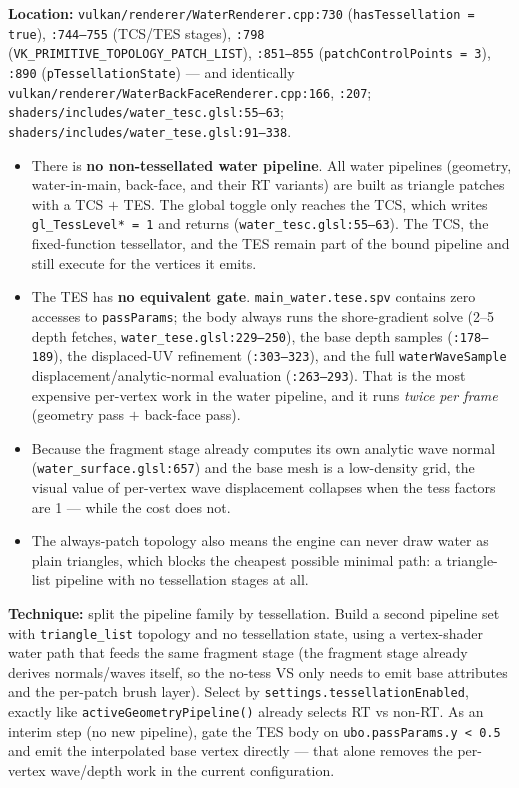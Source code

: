 \documentclass[11pt,a4paper]{article}
\begin{document}
\textbf{Location:} \texttt{vulkan/renderer/WaterRenderer.cpp:730} (\texttt{hasTessellation = true}), \texttt{:744--755} (TCS/TES stages), \texttt{:798}
(\texttt{VK\_PRIMITIVE\_TOPOLOGY\_PATCH\_LIST}), \texttt{:851--855} (\texttt{patchControlPoints = 3}), \texttt{:890} (\texttt{pTessellationState}) --- and identically
\texttt{vulkan/renderer/WaterBackFaceRenderer.cpp:166}, \texttt{:207}; \texttt{shaders/includes/water\_tesc.glsl:55--63}; \texttt{shaders/includes/water\_tese.glsl:91--338}.

\begin{itemize}
    \item There is \textbf{no non-tessellated water pipeline}. All water pipelines (geometry, water-in-main, back-face, and their RT variants) are built as triangle patches with a
    TCS $+$ TES. The global toggle only reaches the TCS, which writes \texttt{gl\_TessLevel* = 1} and returns (\texttt{water\_tesc.glsl:55--63}). The TCS, the fixed-function
    tessellator, and the TES remain part of the bound pipeline and still execute for the vertices it emits.
    \item The TES has \textbf{no equivalent gate}. \texttt{main\_water.tese.spv} contains zero accesses to \texttt{passParams}; the body always runs the shore-gradient solve
    (2--5 depth fetches, \texttt{water\_tese.glsl:229--250}), the base depth samples (\texttt{:178--189}), the displaced-UV refinement (\texttt{:303--323}), and the full
    \texttt{waterWaveSample} displacement/analytic-normal evaluation (\texttt{:263--293}). That is the most expensive per-vertex work in the water pipeline, and it runs
    \emph{twice per frame} (geometry pass $+$ back-face pass).
    \item Because the fragment stage already computes its own analytic wave normal (\texttt{water\_surface.glsl:657}) and the base mesh is a low-density grid, the visual value of
    per-vertex wave displacement collapses when the tess factors are 1 --- while the cost does not.
    \item The always-patch topology also means the engine can never draw water as plain triangles, which blocks the cheapest possible minimal path: a triangle-list pipeline with no
    tessellation stages at all.
\end{itemize}

\textbf{Technique:} split the pipeline family by tessellation. Build a second pipeline set with \texttt{triangle\_list} topology and no tessellation state, using a vertex-shader
water path that feeds the same fragment stage (the fragment stage already derives normals/waves itself, so the no-tess VS only needs to emit base attributes and the per-patch
brush layer). Select by \texttt{settings.tessellationEnabled}, exactly like \texttt{activeGeometryPipeline()} already selects RT vs non-RT. As an interim step (no new pipeline),
gate the TES body on \texttt{ubo.passParams.y < 0.5} and emit the interpolated base vertex directly --- that alone removes the per-vertex wave/depth work in the current
configuration.
\end{document}
